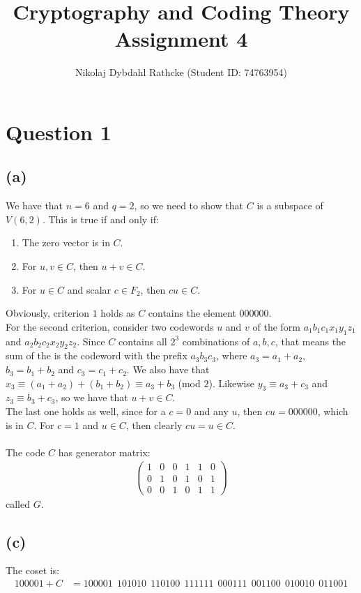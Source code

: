 \documentclass[a4paper, fleqn]{article}
\author{Nikolaj Dybdahl Rathcke (Student ID: 74763954)}
\title{Cryptography and Coding Theory  \\ Assignment 4}
\begin{document}


\section*{Question 1}
\subsection*{(a)}
We have that $n=6$ and $q=2$, so we need to show that $C$ is a subspace of $V(6,2)$. This
is true if and only if:
\begin{enumerate}
  \item The zero vector is in $C$.
  \item For $u,v\in C$, then $u+v\in C$.
  \item For $u\in C$ and scalar $c\in F_2$, then $cu\in C$.
\end{enumerate}
Obviously, criterion $1$ holds as $C$ contains the element $000000$. \\
For the second criterion, consider two codewords $u$ and $v$ of the form
$a_1b_1c_1x_1y_1z_1$ and $a_2b_2c_2x_2y_2z_2$. Since $C$ contains all $2^3$ combinations
of $a,b,c$, that means the sum of the is the codeword with the prefix $a_3b_3c_3$, where $a_3=a_1+a_2$, $b_3=b_1+b_2$ and $c_3=c_1+c_2$. We also have that $x_3\equiv (a_1+a_2)+(b_1+b_2)\equiv
a_3+b_3$ (mod $2$). Likewise $y_3\equiv a_3+c_3$ and $z_3\equiv b_3+c_3$, so we have that
$u+v\in C$. \\
The last one holds as well, since for a $c=0$ and any $u$, then $cu=000000$, which is in
$C$. For $c=1$ and $u\in C$, then clearly $cu=u\in C$. \\
\\
The code $C$ has generator matrix:
\begin{align*}
  \begin{pmatrix}
    1 & 0 & 0 & 1 & 1 & 0 \\
    0 & 1 & 0 & 1 & 0 & 1 \\
    0 & 0 & 1 & 0 & 1 & 1
  \end{pmatrix}
\end{align*}
called $G$.

\subsection*{(c)}
The coset is:
\begin{align*}
  100001+C &= 100001\ \ 101010\ \ 110100\ \ 111111\ \ 000111\ \ 001100\ \ 010010\ \ 011001
\end{align*}
\end{document}
